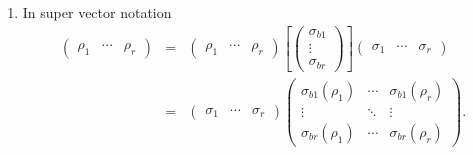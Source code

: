 \documentclass[aps,preprint]{revtex4}
\begin{document}
\begin{enumerate}
\begin{equation}
\right) =\left[ \left( 
\begin{array}{c}
\sigma _{b1} \\ 
\vdots \\ 
\sigma _{br}%
\end{array}%
\right) \right] \left( 
\begin{array}{ccc}
\rho _{1} & \cdots & \rho _{r}%
\end{array}%
\right)
\end{equation}%
giving 
\begin{gather}
\mathbb{S}_{\rho \sigma }=\mathcal{R}_{\rho }\left( S_{\rho \sigma }\right) =%
\mathcal{R}_{\sigma }\left( S_{\rho \sigma }\right) \\
\parallel \\
\left( 
\begin{array}{ccc}
\sigma _{b1}\left( \rho _{1}\right) & \cdots & \sigma _{b1}\left( \rho
_{r}\right) \\ 
\vdots & \ddots & \vdots \\ 
\sigma _{br}\left( \rho _{1}\right) & \cdots & \sigma _{br}\left( \rho
_{r}\right)%
\end{array}%
\right) =\left[ \left( 
\begin{array}{c}
\rho _{b1} \\ 
\vdots \\ 
\rho _{br}%
\end{array}%
\right) \right] \left( 
\begin{array}{ccc}
\sigma _{1} & \cdots & \sigma _{r}%
\end{array}%
\right) .
\end{gather}

\item In super vector notation%
\begin{eqnarray}
\left( 
\begin{array}{ccc}
\rho _{1} & \cdots & \rho _{r}%
\end{array}%
\right) &=&\left( 
\begin{array}{ccc}
\rho _{1} & \cdots & \rho _{r}%
\end{array}%
\right) \left[ \left( 
\begin{array}{c}
\sigma _{b1} \\ 
\vdots \\ 
\sigma _{br}%
\end{array}%
\right) \right] \left( 
\begin{array}{ccc}
\sigma _{1} & \cdots & \sigma _{r}%
\end{array}%
\right) \\
&=&\left( 
\begin{array}{ccc}
\sigma _{1} & \cdots & \sigma _{r}%
\end{array}%
\right) \left( 
\begin{array}{ccc}
\sigma _{b1}\left( \rho _{1}\right) & \cdots & \sigma _{b1}\left( \rho
_{r}\right) \\ 
\vdots & \ddots & \vdots \\ 
\sigma _{br}\left( \rho _{1}\right) & \cdots & \sigma _{br}\left( \rho
_{r}\right)%
\end{array}%
\right) .
\end{eqnarray}


\end{enumerate}
\end{document}
